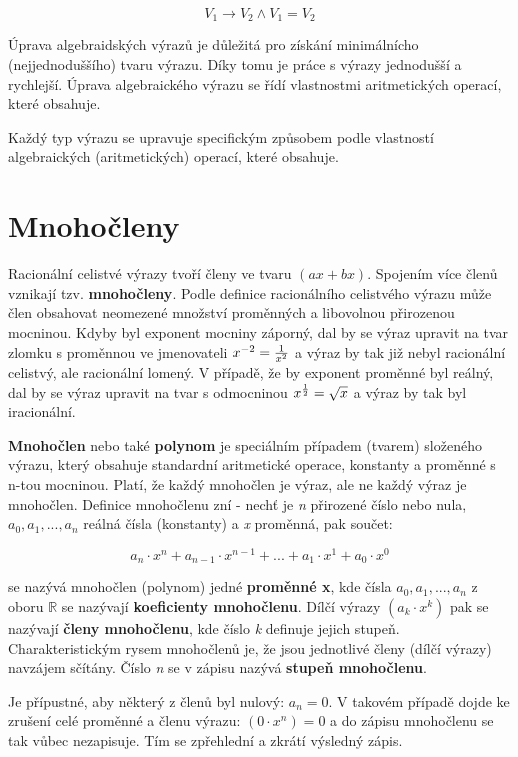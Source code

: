 \documentclass[11pt]{article}
\begin{document}
$$ V_1 \rightarrow V_2 \wedge V_1 = V_2 $$

Úprava algebraidských výrazů je důležitá pro získání minimálnícho (nejjednoduššího) tvaru výrazu. Díky tomu je práce s výrazy jednodušší a rychlejší. Úprava algebraického výrazu se řídí vlastnostmi aritmetických operací, které obsahuje.

Každý typ výrazu se upravuje specifickým způsobem podle vlastností algebraických (aritmetických) operací, které obsahuje.



\section{Mnohočleny}

Racionální celistvé výrazy tvoří členy ve tvaru $(ax + bx)$. Spojením více členů vznikají tzv. {\bf mnohočleny}. Podle definice racionálního celistvého výrazu může člen obsahovat neomezené množství proměnných a libovolnou přirozenou mocninou. Kdyby byl exponent mocniny záporný, dal by se výraz upravit na tvar zlomku s proměnnou ve jmenovateli $x^{-2} = {1\over x^{2}}$ a výraz by tak již nebyl racionální celistvý, ale racionální lomený. V případě, že by exponent proměnné byl reálný, dal by se výraz upravit na tvar s odmocninou $x^{1\over 2} = \sqrt{x}$ a výraz by tak byl iracionální.

{\bf Mnohočlen} nebo také {\bf polynom} je speciálním případem (tvarem) složeného výrazu, který obsahuje standardní aritmetické operace, konstanty a proměnné s n-tou mocninou. Platí, že každý mnohočlen je výraz, ale ne každý výraz je mnohočlen. Definice mnohočlenu zní - nechť je {\it n} přirozené číslo nebo nula, $ a_0, a_1, ..., a_n$ reálná čísla (konstanty) a {\it x} proměnná, pak součet:

$$ a_n \cdot x^n + a_{n-1} \cdot x^{n-1} + ... + a_1 \cdot x^1 + a_0 \cdot x^0  $$

se nazývá  mnohočlen (polynom) jedné {\bf proměnné x}, kde čísla $a_0, a_1, ..., a_n$ z oboru $\mathbb{R}$ se nazývají {\bf koeficienty mnohočlenu}. Dílčí výrazy $ (a_k \cdot x^k) $ pak se nazývají {\bf členy mnohočlenu}, kde číslo {\it k} definuje jejich stupeň. Charakteristickým rysem mnohočlenů je, že jsou jednotlivé členy (dílčí výrazy) navzájem sčítány. Číslo {\it n} se v zápisu nazývá {\bf stupeň mnohočlenu}. 

Je přípustné, aby některý z členů byl nulový: $a_n = 0$. V takovém případě dojde ke zrušení celé proměnné a členu výrazu: $(0 \cdot x^n) = 0$ a do zápisu mnohočlenu se tak vůbec nezapisuje. Tím se zpřehlední a zkrátí výsledný zápis. 
\end{document}
